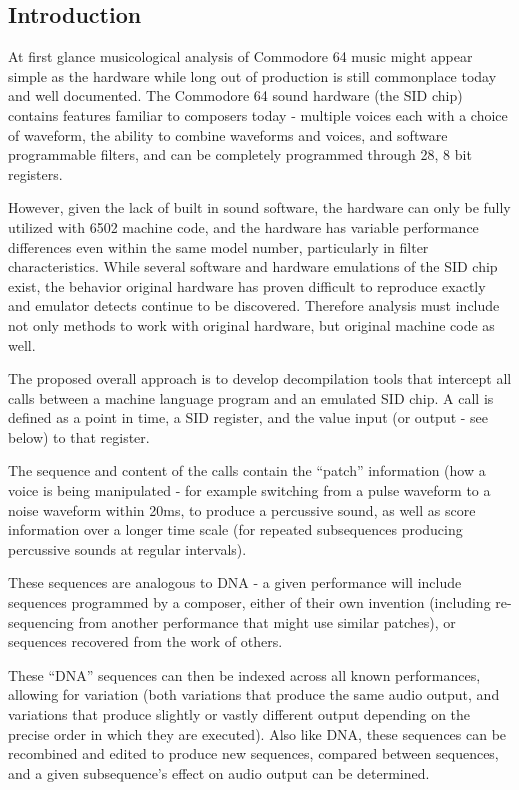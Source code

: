 \documentclass[10pt]{article}
\begin{document}
        \vspace{5mm}

\begin{multicols*}{2}

  \section{Introduction}

  At first glance musicological analysis of Commodore 64 music might
  appear simple as the hardware while long out of production is still
  commonplace today and well documented. The Commodore 64 sound
  hardware (the SID chip) contains features familiar to composers
  today - multiple voices each with a choice of waveform, the ability
  to combine waveforms and voices, and software programmable filters,
  and can be completely programmed through 28, 8 bit registers.

  However, given the lack of built in sound software, the hardware can
  only be fully utilized with 6502 machine code, and the hardware has
  variable performance differences even within the same model number,
  particularly in filter characteristics. While several software and
  hardware emulations of the SID chip exist, the behavior original
  hardware has proven difficult to reproduce exactly and emulator
  detects continue to be discovered.  Therefore analysis must include
  not only methods to work with original hardware, but original
  machine code as well.

  The proposed overall approach is to develop decompilation tools
  that intercept all calls between a machine language program and an
  emulated SID chip. A call is defined as a point in time, a SID
  register, and the value input (or output - see below) to that
  register.

  The sequence and content of the calls contain the ``patch''
  information (how a voice is being manipulated - for example
  switching from a pulse waveform to a noise waveform within 20ms, to
  produce a percussive sound, as well as score information over a
  longer time scale (for repeated subsequences producing percussive
  sounds at regular intervals).

  These sequences are analogous to DNA - a given performance will
  include sequences programmed by a composer, either of their own
  invention (including re-sequencing from another performance that
  might use similar patches), or sequences recovered from the work of
  others.

  These ``DNA'' sequences can then be indexed across all known
  performances, allowing for variation (both variations that produce
  the same audio output, and variations that produce slightly or
  vastly different output depending on the precise order in which they
  are executed). Also like DNA, these sequences can be recombined and
  edited to produce new sequences, compared between sequences, and a
  given subsequence's effect on audio output can be determined.


\end{multicols*}
\end{document}
